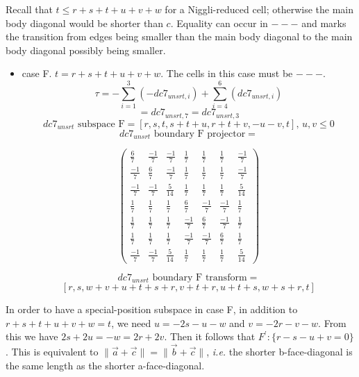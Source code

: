 \documentclass[preprint]{iucr}              %
\begin{document}
{Recall that $t \leq r+s+t+u+v+w$ for a Niggli-reduced cell; otherwise
the main body diagonal would be shorter than $c$.  Equality can occur 
in $---$ and marks
the transition from edges being smaller than the main body diagonal to
the main body diagonal possibly being smaller.

\begin{itemize}
    \item{case F. $t = r+s+t+u+v+w$.  The cells in this case must be $---$.
    \[\tau=-\sum_{i=1}^3(-dc7_{unsrt,i})+\sum_{i=4}^6(dc7_{unsrt,i})\]
    \[=dc7_{unsrt,7}=dc7_{unsrt,3}\]
    \[dc7_{unsrt} \text{ subspace F}=[r,s,t,s+t+u,r+t+v,-u-v,t],\, u, v \leq 0 \]
    \[dc7_{unsrt} \text{ boundary F projector}=\]
\begin{center}
\begin{equation*}
\begin{pmatrix}
\frac{6}{7}&\frac{-1}{7}&\frac{-1}{7}&\frac{1}{7}&\frac{1}{7}&\frac{1}{7}&\frac{-1}{7}\\[.25em]
\frac{-1}{7}&\frac{6}{7}&\frac{-1}{7}&\frac{1}{7}&\frac{1}{7}&\frac{1}{7}&\frac{-1}{7}\\[.25em]
\frac{-1}{7}&\frac{-1}{7}&\frac{5}{14}&\frac{1}{7}&\frac{1}{7}&\frac{1}{7}&\frac{5}{14}\\[.25em]
\frac{1}{7}&\frac{1}{7}&\frac{1}{7}&\frac{6}{7}&\frac{-1}{7}&\frac{-1}{7}&\frac{1}{7}\\[.25em]
\frac{1}{7}&\frac{1}{7}&\frac{1}{7}&\frac{-1}{7}&\frac{6}{7}&\frac{-1}{7}&\frac{1}{7}\\[.25em]
\frac{1}{7}&\frac{1}{7}&\frac{1}{7}&\frac{-1}{7}&\frac{-1}{7}&\frac{6}{7}&\frac{1}{7}\\[.25em]
\frac{-1}{7}&\frac{-1}{7}&\frac{5}{14}&\frac{1}{7}&\frac{1}{7}&\frac{1}{7}&\frac{5}{14}
\end{pmatrix}
\end{equation*}
\end{center}


    \[dc7_{unsrt} \text{ boundary F transform}=\]
    \[[r,s,w+v+u+t+s+r,v+t+r,u+t+s,w+s+r,t] \]
    }
\end{itemize}

In order to have a special-position subspace in case F, in addition to $r+ s + t  + u + v +  w = t$, we need $u = -2 s - u -w$ and $v = -2 r - v - w$. From this we have 
$2 s + 2 u = -w = 2 r + 2 v$. Then it follows that $F^\prime\!:\{r - s - u+v = 0\}$.  
This is equivalent to
\(\|\overrightarrow{a}+\overrightarrow{c}\| = \|\overrightarrow{b}+\overrightarrow{c}\|\), \textit{i.e.}
the shorter b-face-diagonal is the same length as the shorter  a-face-diagonal.


}
\end{document}
